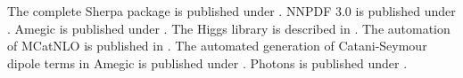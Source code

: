 \documentclass{article}
\begin{document}
The complete Sherpa package is published under \cite{Gleisberg:2008ta}.
NNPDF 3.0 is published under \cite{Ball:2014uwa}.
Amegic is published under \cite{Krauss:2001iv}.
The Higgs library is described in \cite{}.
The automation of MCatNLO is published in \cite{Hoeche:2011fd}.
The automated generation of Catani-Seymour dipole terms in Amegic is published under \cite{Gleisberg:2007md}.
Photons is published under \cite{Schonherr:2008av}.
\end{document}
